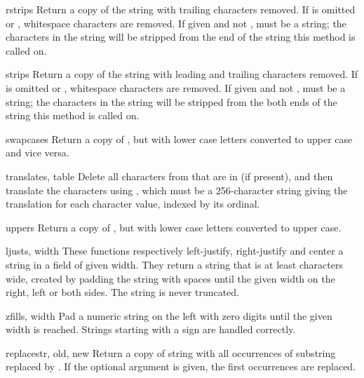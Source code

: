 \begin{funcdesc}{rstrip}{s}
Return a copy of the string with trailing characters removed.  If
 is omitted or , whitespace characters are
removed.  If given and not ,  must be a string;
the characters in the string will be stripped from the end of the
string this method is called on.
\end{funcdesc}

\begin{funcdesc}{strip}{s}
Return a copy of the string with leading and trailing characters
removed.  If  is omitted or , whitespace
characters are removed.  If given and not , 
must be a string; the characters in the string will be stripped from
the both ends of the string this method is called on.
\end{funcdesc}

\begin{funcdesc}{swapcase}{s}
  Return a copy of , but with lower case letters
  converted to upper case and vice versa.
\end{funcdesc}

\begin{funcdesc}{translate}{s, table}
  Delete all characters from  that are in  (if 
  present), and then translate the characters using , which 
  must be a 256-character string giving the translation for each
  character value, indexed by its ordinal.  
\end{funcdesc}

\begin{funcdesc}{upper}{s}
  Return a copy of , but with lower case letters converted to
  upper case.
\end{funcdesc}

\begin{funcdesc}{ljust}{s, width}
  These functions respectively left-justify, right-justify and center
  a string in a field of given width.  They return a string that is at
  least  characters wide, created by padding the string
   with spaces until the given width on the right, left or both
  sides.  The string is never truncated.
\end{funcdesc}

\begin{funcdesc}{zfill}{s, width}
  Pad a numeric string on the left with zero digits until the given
  width is reached.  Strings starting with a sign are handled
  correctly.
\end{funcdesc}

\begin{funcdesc}{replace}{str, old, new}
  Return a copy of string  with all occurrences of substring
   replaced by .  If the optional argument
   is given, the first  occurrences are
  replaced.
\end{funcdesc}

